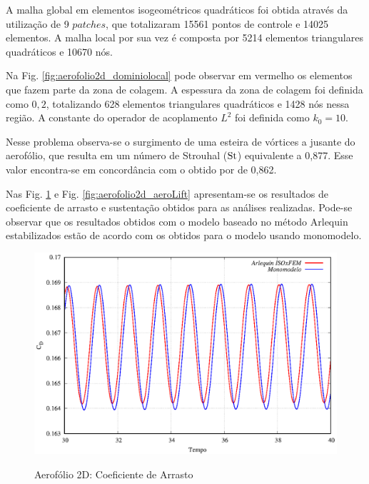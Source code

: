 \documentclass[tese_patricia]{subfiles}
\begin{document}
A malha global em elementos isogeométricos quadráticos foi obtida através da utilização de 9 $patches$, que totalizaram 15561 pontos de controle e 14025 elementos. A malha local por sua vez é composta por 5214 elementos triangulares quadráticos e 10670 nós. 

Na Fig. \ref{fig:aerofolio2d_dominiolocal} pode observar em vermelho os elementos que fazem parte da zona de colagem. A espessura da zona de colagem foi definida como $0,2$, totalizando 628 elementos triangulares quadráticos e 1428 nós nessa região. A constante do operador de acoplamento $L^{2}$ foi definida como $k_{0} = 10$. 


Nesse problema observa-se o surgimento de uma esteira de vórtices a jusante do aerofólio, que resulta em um número de Strouhal ($\mathrm{St}$) equivalente a 0,877. Esse valor encontra-se em concordância com o obtido por  de 0,862. 

Nas Fig. \ref{fig:aerofolio2d_aeroDrag} e Fig. \ref{fig:aerofolio2d_aeroLift} apresentam-se os resultados de coeficiente de arrasto e sustentação obtidos para as análises realizadas. Pode-se observar que os resultados obtidos com o modelo baseado no método Arlequin estabilizados estão de acordo com os obtidos para o modelo usando monomodelo.


\begin{figure}[htb!]
	\centering 
	{\includegraphics[scale=1.0,trim=0cm 0cm 0cm 0cm, clip=true]{Imagens/Cap6/DragRe.eps}}	
	\caption{Aerofólio 2D: Coeficiente de Arrasto}
	\label{fig:aerofolio2d_aeroDrag}
\end{figure}
\end{document}
